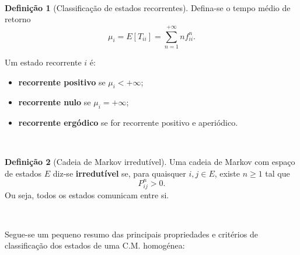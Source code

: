 \documentclass[
  11pt,
  a4paper,
]{book}
\theoremstyle{definition}
\newtheorem{definition}{Definição}[chapter]
\theoremstyle{definition}
\theoremstyle{definition}
\theoremstyle{definition}
\theoremstyle{remark}
\begin{document}
\(\,\)

\begin{definition}[Classificação de estados recorrentes]

Defina-se o tempo médio de retorno
\[
\mu_i = E[T_{ii}] = \sum_{n=1}^{+\infty} n f_{ii}^n.
\]

Um estado recorrente \(i\) é:

\begin{itemize}
\item
  \textbf{recorrente positivo} se \(\mu_i < +\infty\);
\item
  \textbf{recorrente nulo} se \(\mu_i = +\infty\);
\item
  \textbf{recorrente ergódico} se for recorrente positivo e aperiódico.\\
\end{itemize}

\end{definition}

\(\,\)

\begin{definition}[Cadeia de Markov irredutível]
Uma cadeia de Markov com espaço de estados \(E\) diz-se \textbf{irredutível} se, para quaisquer \(i, j \in E\), existe \(n \geq 1\) tal que
\[
P_{ij}^n > 0.
\]
Ou seja, todos os estados comunicam entre si.
\end{definition}

\(\,\)

Segue-se um pequeno resumo das principais propriedades e critérios de classificação dos estados de uma C.M. homogénea:

\(\,\)
\end{document}
